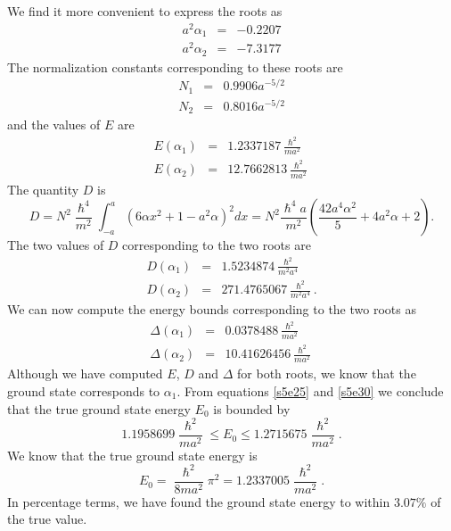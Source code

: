 \documentclass{article}
\numberwithin{equation}{section}
\begin{document}
We find it more convenient to express the roots as
\begin{eqnarray}
a^2\alpha_1 &=& -0.2207 \label{s5e21} \\
a^2\alpha_2 &=& -7.3177 \label{s5e22}
\end{eqnarray}
The normalization constants corresponding to these roots are
\begin{eqnarray}
N_1 &=& 0.9906 a^{-5/2} \label{s5e23} \\
N_2 &=& 0.8016 a^{-5/2} \label{s5e24}
\end{eqnarray}
and the values of $E$ are
\begin{eqnarray}
E(\alpha_1) &=& 1.2337187\frac{\hslash^2}{ma^2} \label{s5e25} \\
E(\alpha_2) &=& 12.7662813\frac{\hslash^2}{ma^2} \label{s5e26}
\end{eqnarray}
The quantity $D$ is
\begin{equation}\label{s5e27}
D = N^2\frac{\hslash^4}{m^2}\int_{-a}^a(6\alpha x^2 + 1 - a^2\alpha)^2dx
= N^2\frac{\hslash^4a}{m^2}\left(\frac{42a^4\alpha^2}{5} + 4a^2\alpha + 2
\right).
\end{equation}
The two values of $D$ corresponding to the two roots are
\begin{eqnarray}
D(\alpha_1) &=& 1.5234874\frac{\hslash^2}{m^2a^4} \label{s5e28} \\
D(\alpha_2) &=& 271.4765067\frac{\hslash^2}{m^2a^4} \label{s5e29}.
\end{eqnarray}
We can now compute the energy bounds corresponding to the two roots as
\begin{eqnarray}
\Delta(\alpha_1) &=& 0.0378488\frac{\hslash^2}{ma^2} \label{s5e30} \\
\Delta(\alpha_2) &=& 10.41626456\frac{\hslash^2}{ma^2} \label{s5e31}
\end{eqnarray}
Although we have computed $E$, $D$ and $\Delta$ for both roots, we know that
the ground state corresponds to $\alpha_1$. From equations \eqref{s5e25}
and \eqref{s5e30} we conclude that the true ground state energy $E_0$
is bounded by
\begin{equation}\label{s5e32}
1.1958699\frac{\hslash^2}{ma^2} \le E_0 \le 1.2715675\frac{\hslash^2}{ma^2}.
\end{equation}
We know that the true ground state energy is
\begin{equation}\label{s5e33}
E_0 = \frac{\hslash^2}{8ma^2}\pi^2 = 1.2337005\frac{\hslash^2}{ma^2}.
\end{equation}
In percentage terms, we have found the ground state energy to within $3.07
\%$ of the true value.
\end{document}
